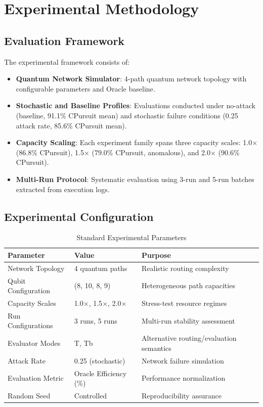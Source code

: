 \documentclass[12pt,a4paper]{article}
\begin{document}
\section{Experimental Methodology}

\subsection{Evaluation Framework}

The experimental framework consists of:

\begin{itemize}
    \item \textbf{Quantum Network Simulator}: 4-path quantum network topology with configurable parameters and Oracle baseline.
    \item \textbf{Stochastic and Baseline Profiles}: Evaluations conducted under no-attack (baseline, 91.1\% CPursuit mean) and stochastic failure conditions (0.25 attack rate, 85.6\% CPursuit mean).
    \item \textbf{Capacity Scaling}: Each experiment family spans three capacity scales: 1.0$\times$ (86.8\% CPursuit), 1.5$\times$ (79.0\% CPursuit, anomalous), and 2.0$\times$ (90.6\% CPursuit).
    \item \textbf{Multi-Run Protocol}: Systematic evaluation using 3-run and 5-run batches extracted from execution logs.
\end{itemize}

\subsection{Experimental Configuration}

\begin{table}[H]
\centering
\caption{Standard Experimental Parameters}
\begin{tabular}{@{}lll@{}}
\toprule
\textbf{Parameter} & \textbf{Value} & \textbf{Purpose} \\
\midrule
Network Topology & 4 quantum paths & Realistic routing complexity \\
Qubit Configuration & (8, 10, 8, 9) & Heterogeneous path capacities \\
Capacity Scales & 1.0$\times$, 1.5$\times$, 2.0$\times$ & Stress-test resource regimes \\
Run Configurations & 3 runs, 5 runs & Multi-run stability assessment \\
Evaluator Modes & T, Tb & Alternative routing/evaluation semantics \\
Attack Rate & 0.25 (stochastic) & Network failure simulation \\
Evaluation Metric & Oracle Efficiency (\%) & Performance normalization \\
Random Seed & Controlled & Reproducibility assurance \\
\bottomrule
\end{tabular}
\end{table}
\end{document}
